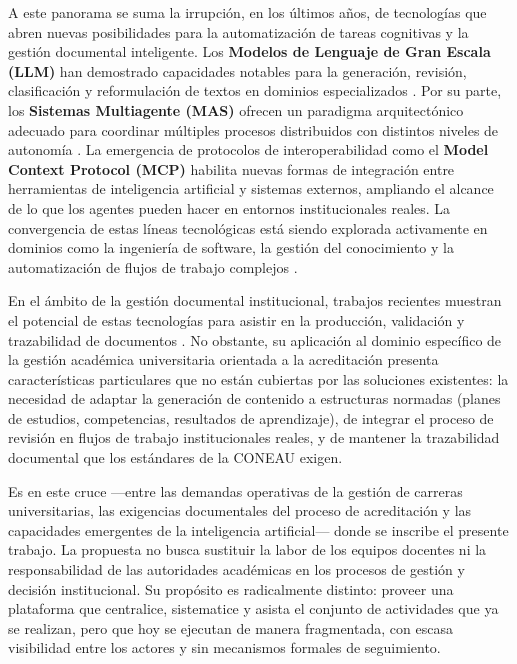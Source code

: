 A este panorama se suma la irrupción, en los últimos años, de tecnologías que abren nuevas posibilidades para la automatización de tareas cognitivas y la gestión documental inteligente. Los \textbf{Modelos de Lenguaje de Gran Escala (LLM)} han demostrado capacidades notables para la generación, revisión, clasificación y reformulación de textos en dominios especializados \citep{garcia2025desarrollo, farsane2025automatizacion}. Por su parte, los \textbf{Sistemas Multiagente (MAS)} ofrecen un paradigma arquitectónico adecuado para coordinar múltiples procesos distribuidos con distintos niveles de autonomía \citep{perez2022breve, sakurada2021multi, jimenez_romero_multi_agent_llm_2025}. La emergencia de protocolos de interoperabilidad como el \textbf{Model Context Protocol (MCP)} \citep{hou2025model, ehtesham2025survey} habilita nuevas formas de integración entre herramientas de inteligencia artificial y sistemas externos, ampliando el alcance de lo que los agentes pueden hacer en entornos institucionales reales. La convergencia de estas líneas tecnológicas está siendo explorada activamente en dominios como la ingeniería de software, la gestión del conocimiento y la automatización de flujos de trabajo complejos \citep{he2025llm, agashe2023llm}.

En el ámbito de la gestión documental institucional, trabajos recientes muestran el potencial de estas tecnologías para asistir en la producción, validación y trazabilidad de documentos \citep{paun2025implementacion, cascavita2025sistema, collado2024implementacion}. No obstante, su aplicación al dominio específico de la gestión académica universitaria orientada a la acreditación presenta características particulares que no están cubiertas por las soluciones existentes: la necesidad de adaptar la generación de contenido a estructuras normadas (planes de estudios, competencias, resultados de aprendizaje), de integrar el proceso de revisión en flujos de trabajo institucionales reales, y de mantener la trazabilidad documental que los estándares de la CONEAU exigen.

Es en este cruce ---entre las demandas operativas de la gestión de carreras universitarias, las exigencias documentales del proceso de acreditación y las capacidades emergentes de la inteligencia artificial--- donde se inscribe el presente trabajo. La propuesta no busca sustituir la labor de los equipos docentes ni la responsabilidad de las autoridades académicas en los procesos de gestión y decisión institucional. Su propósito es radicalmente distinto: proveer una plataforma que centralice, sistematice y asista el conjunto de actividades que ya se realizan, pero que hoy se ejecutan de manera fragmentada, con escasa visibilidad entre los actores y sin mecanismos formales de seguimiento.


